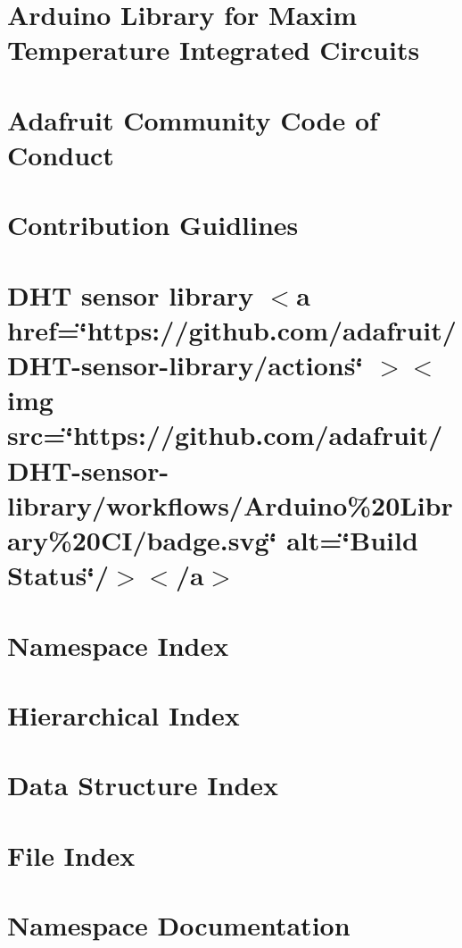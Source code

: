 \documentclass[twoside]{book}
\newcommand{\+}{\discretionary{\mbox{\scriptsize$\hookleftarrow$}}{}{}}
\begin{document}
\chapter{Arduino Library for Maxim Temperature Integrated Circuits}
\label{md_lib__dallas_temperature__r_e_a_d_m_e}

\chapter{Adafruit Community Code of Conduct}
\label{md_lib__d_h_t_code_of_conduct}

\chapter{Contribution Guidlines}
\label{md_lib__d_h_t__c_o_n_t_r_i_b_u_t_i_n_g}

\chapter{DHT sensor library \texorpdfstring{$<$}{<}a href=\char`\"{}https\+://github.\+com/adafruit/\+DHT-\/sensor-\/library/actions\char`\"{} \texorpdfstring{$>$}{>}\texorpdfstring{$<$}{<}img src=\char`\"{}https\+://github.\+com/adafruit/\+DHT-\/sensor-\/library/workflows/\+Arduino\%20\+Library\%20\+CI/badge.\+svg\char`\"{} alt=\char`\"{}\+Build Status\char`\"{}/\texorpdfstring{$>$}{>}\texorpdfstring{$<$}{<}/a\texorpdfstring{$>$}{>}}
\label{md_lib__d_h_t__r_e_a_d_m_e}

\chapter{Namespace Index}

\chapter{Hierarchical Index}

\chapter{Data Structure Index}

\chapter{File Index}

\chapter{Namespace Documentation}



\end{document}
